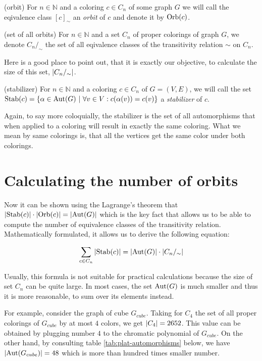 \begin{defn}(orbit)
    For $n \in \mathbb{N}$ and a coloring $c \in C_n$ of some graph $G$ we will call the eqivalence class $[c]_{\sim}$ an \emph{orbit} of $c$ and denote it by $\operatorname{Orb}(c)$.
\end{defn}

\begin{defn}(set of all orbits)
    For $n \in \mathbb{N}$ and a set $C_n$ of proper colorings of graph $G$, we denote $C_n/_\sim$ the set of all eqivalence classes of the transitivity relation $\sim$ on $C_n$.
\end{defn}

Here is a good place to point out, that it is exactly our objective, to calculate the size of this set, $\left|{C_n/_\sim}\right|$.

\begin{defn}(stabilizer)
    For $n \in \mathbb{N}$ and a coloring $c \in C_n$ of $G=(V,E)$, we will call the set $\operatorname{Stab}(c) = \{ \alpha \in \operatorname{Aut}(G) \ | \ \forall v \in V : c(\alpha(v)) = c(v) \}$ a \emph{stabilizer} of $c$. 
\end{defn}

Again, to say more coloquially, the stabilizer is the set of all automorphisms that when applied to a coloring will result in exactly the same coloring. What we mean by same colorings is, that all the vertices get the same color under both colorings.

\section{Calculating the number of orbits}

Now it can be shown using the Lagrange's theorem that $\left|{\operatorname{Stab}(c)}\right| \cdot \left|{\operatorname{Orb}(c)}\right| = \left|{\operatorname{Aut}(G)}\right|$ which is the key fact that allows us to be able to compute the number of equivalence classes of the transitivity relation. Mathematically formulated, it allows us to derive the following equation:

\begin{equation}\label{eqn:orbits-by-stab}
    \sum_{c\in C_n}\left|{\operatorname{Stab}(c)}\right| = \left|{\operatorname{Aut}(G)}\right| \cdot \left|{C_n/_\sim}\right| 
\end{equation}


Usually, this formula is not suitable for practical calculations because the size of set $C_n$ can be quite large. In most cases, the set $\operatorname{Aut}(G)$ is much smaller and thus it is more reasonable, to sum over its elements instead. 

For example, consider the graph of cube $G_{cube}$. Taking for $C_4$ the set of all proper colorings of $G_{cube}$ by at most $4$ colors, we get $\left|{C_4}\right| = 2652$. This value can be obtained by plugging number $4$ to the chromatic polynomial of $G_{cube}$. On the other hand, by consulting table \ref{tab:plat-automorphisms} below, we have $\left|{\operatorname{Aut}(G_{cube})}\right| = 48$ which is more than hundred times smaller number.

